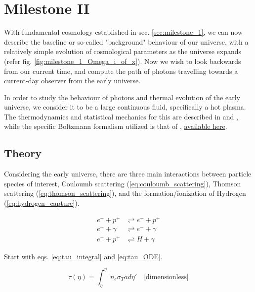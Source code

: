 \section{Milestone II}\label{sec:milestone_2}
With fundamental cosmology established in sec. \ref{sec:milestone_1}, we can now describe the baseline or so-called "background" behaviour of our universe, with a relatively simple evolution of cosmological parameters as the universe expands (refer fig. \ref{fig:milestone_1_Omega_i_of_x}). Now we wish to look backwards from our current time, and compute the path of photons travelling towards a current-day observer from the early universe.

In order to study the behaviour of photons and thermal evolution of the early universe, we consider it to be a large continuous fluid, specifically a hot plasma. The thermodynamics and statistical mechanics for this are described in \citet[chap.~3]{baumannLectureNotesCosmology2017} and \citet[chap.~3, 4]{dodelsonModernCosmology2003}, while the specific Boltzmann formalism utilized is that of \citet{wintherCosmologyIILecture2024}, \href{https://cmb.wintherscoming.no/theory_thermodynamics.php#thermo}{available here}.

\subsection{Theory}
Considering the early universe, there are three main interactions between particle species of interest, Couloumb scattering (\ref{eq:couloumb_scattering}), Thomson scattering (\ref{eq:thomson_scattering}), and the formation/ionization of Hydrogen (\ref{eq:hydrogen_capture}).

\begin{align}
e^- + p^+ &\rightleftharpoons e^- + p^+ \label{eq:couloumb_scattering} \\
e^- + \gamma &\rightleftharpoons e^- + \gamma \label{eq:thomson_scattering} \\
e^- + p^+ &\rightleftharpoons H + \gamma \label{eq:hydrogen_capture}
\end{align}

Start with eqs. \ref{eq:tau_integral} \citep[sec.~4.4]{dodelsonModernCosmology2003} and \ref{eq:tau_ODE}.

\begin{equation}\label{eq:tau_integral}
\tau(\eta) = \int_{\eta}^{\eta_0} n_e \sigma_T a d\eta' \quad \text{[dimensionless]}
\end{equation}

